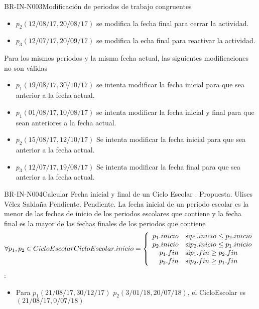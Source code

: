 \begin{BusinessRule}{BR-IN-N003}{Modificación de periodos de trabajo congruentes}
\begin{itemize}
			\item $p_{2}(12/08/17, 20/08/17)$ se modifica la fecha final para cerrar la actividad.
			\item $p_{3}(12/07/17, 20/09/17)$ se modifica la echa final para reactivar la actividad.
		\end{itemize}
	 Para los mismos periodos y la misma fecha actual, las siguientes modificaciones no son válidas
		\begin{itemize}
			\item $p_{1}(19/08/17, 30/10/17)$ se intenta modificar la fecha inicial para que sea anterior a la fecha actual.
			\item $p_{1}(01/08/17, 10/08/17)$ se intenta modificar la fecha inicial y final para que sean anteriores a la fecha actual.
			\item $p_{2}(15/08/17, 12/10/17)$ Se intenta modificar la fecha inicial para que sea anterior a la fecha actual.
			\item $p_{3}(12/07/17, 19/08/17)$ Se intenta modificar la fecha final para que sea anterior a la fecha actual.
		\end{itemize}
\end{BusinessRule}

\begin{BusinessRule}{BR-IN-N004}{Calcular Fecha inicial y final de un Ciclo Escolar}
	{\bcDerivation}    %
	{\btEnabler}     %
	{\blControlling}    %
	.
	\BRItem[Estado] Propuesta.
	 Ulises Vélez Saldaña
	 Pendiente.
	 Pendiente.
	\BRItem[Descripción] La fecha inicial de un periodo escolar es la menor de las fechas de inicio de los periodos escolares que contiene y la fecha final es la mayor de las fechas finales de los periodos que contiene
	\BRItem[Sentencia] 
		\[
			\forall p_{1}, p_{2} \in CicloEscolar\\
			CicloEscolar.inicio = \left\{
			\begin{array}{rl}
    			 p_{1}.inicio & \text{si} p_{1}.inicio \leq p_{2}.inicio\\ 
    			 p_{2}.inicio & \text{si} p_{2}.inicio \leq p_{1}.inicio\\
    			 p_{1}.fin & \text{si} p_{1}.fin \geq p_{2}.fin\\ 
    			 p_{2}.fin & \text{si} p_{2}.fin \geq p_{1}.fin\\
        	\end{array} \right.
		\]
	\BRItem[Motivación] 
	\BRItem[Ejemplo]:
		\begin{itemize}
			\item Para $p_{1}(21/08/17, 30/12/17)$ $p_{2}(3/01/18, 20/07/18)$, el CicloEscolar es $(21/08/17, 0/07/18)$
		\end{itemize}
\end{BusinessRule}




